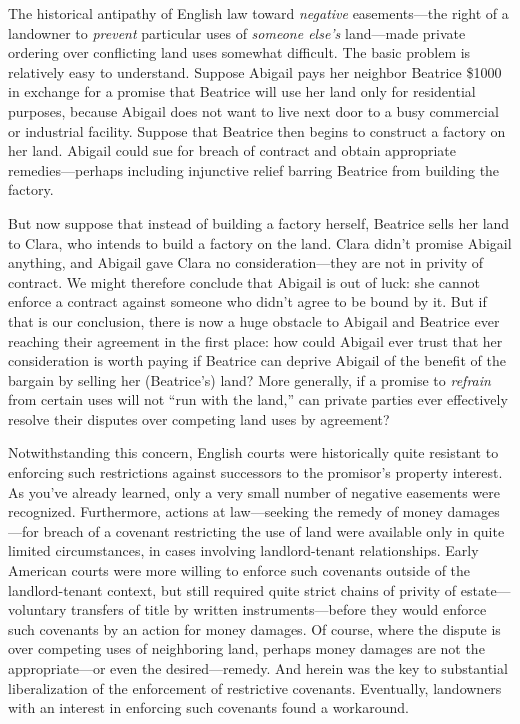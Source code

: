 
\label{abigail-beatrice-clara}

The historical antipathy of English law toward \textit{negative} easements---the
right of a landowner to \textit{prevent} particular uses of \textit{someone
else's} land---made private ordering over conflicting land uses somewhat
difficult. The basic problem is relatively easy to understand. Suppose Abigail
pays her neighbor Beatrice \$1000 in exchange for a promise that Beatrice will
use her land only for residential purposes, because Abigail does not want to
live next door to a busy commercial or industrial facility. Suppose that
Beatrice then begins to construct a factory on her land. Abigail could sue for
breach of contract and obtain appropriate remedies---perhaps including
injunctive relief barring Beatrice from building the factory.

But now suppose that instead of building a factory herself, Beatrice sells her
land to Clara, who intends to build a factory on the land. Clara didn't promise
Abigail anything, and Abigail gave Clara no consideration---they are not in
privity of contract. We might therefore conclude that Abigail is out of luck:
she cannot enforce a contract against someone who didn't agree to be bound by
it. But if that is our conclusion, there is now a huge obstacle to Abigail and
Beatrice ever reaching their agreement in the first place: how could Abigail
ever trust that her consideration is worth paying if Beatrice can deprive
Abigail of the benefit of the bargain by selling her (Beatrice's) land? More
generally, if a promise to \textit{refrain} from certain uses will not ``run
with the land,'' can private parties ever effectively resolve their disputes
over competing land uses by agreement?


Notwithstanding this concern, English courts were historically quite resistant
to enforcing such restrictions against successors to the promisor's property
interest. As you've already learned, only a very small number of negative
easements were recognized. Furthermore, actions at law---seeking the remedy of
money damages---for breach of a covenant restricting the use of land were
available only in quite limited circumstances, in cases involving
landlord-tenant relationships. Early American courts were more willing to
enforce such covenants outside of the landlord-tenant context, but still
required quite strict chains of privity of estate---voluntary transfers of title
by written instruments---before they would enforce such covenants by an action
for money damages. Of course, where the dispute is over competing uses of
neighboring land, perhaps money damages are not the appropriate---or even the
desired---remedy. And herein was the key to substantial liberalization of the
enforcement of restrictive covenants. Eventually, landowners with an interest in
enforcing such covenants found a workaround.

